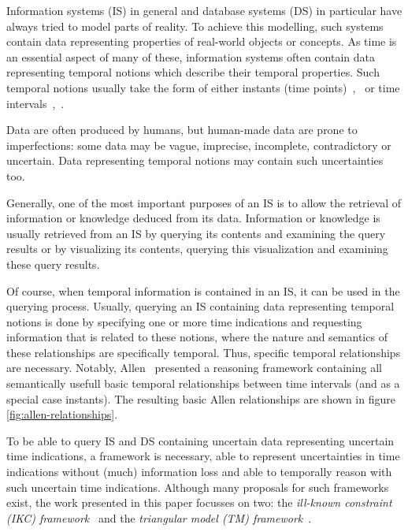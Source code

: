 Information systems (IS) in general and database systems (DS) in particular have always tried to model parts of reality. To achieve this modelling, such systems contain data representing properties of real-world objects or concepts. As time is an essential aspect of many of these, information systems often contain data representing temporal notions which describe their temporal properties. Such temporal notions usually take the form of either instants (time points)~\cite{Dyreson1994},~\cite{Jensen1998} or time intervals~\cite{Dyreson1994},~\cite{Jensen1998}.

Data are often produced by humans, but human-made data are prone to imperfections: some data may be vague, imprecise, incomplete, contradictory or uncertain. Data representing temporal notions may contain such uncertainties too. 

Generally, one of the most important purposes of an IS is to allow the retrieval of information or knowledge deduced from its data. Information or knowledge is usually retrieved from an IS by querying its contents and examining the query results or by visualizing its contents, querying this visualization and examining these query results.

Of course, when temporal information is contained in an IS, it can be used in the querying process. Usually, querying an IS containing data representing temporal notions is done by specifying one or more time indications and requesting information that is related to these notions, where the nature and semantics of these relationships are specifically temporal. Thus, specific temporal relationships are necessary. Notably, Allen~\cite{Allen1983} presented a reasoning framework containing all semantically usefull basic temporal relationships between time intervals (and as a special case instants). The resulting basic Allen relationships are shown in figure \ref{fig:allen-relationships}.

To be able to query IS and DS containing uncertain data representing uncertain time indications, a framework is necessary, able to represent uncertainties in time indications without (much) information loss and able to temporally reason with such uncertain time indications. Although many proposals for such frameworks exist, the work presented in this paper focusses on two: the \emph{ill-known constraint \emph{(IKC)} framework}~\cite{Pons2011} and the \emph{triangular model \emph{(TM)} framework}~\cite{DeTre2012}.


